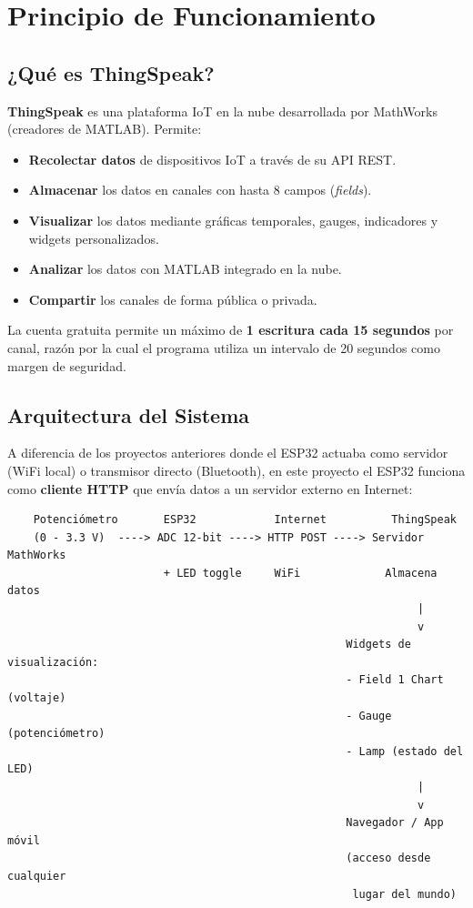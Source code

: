 \documentclass[12pt,a4paper]{article}
\begin{document}
\section{Principio de Funcionamiento}

\subsection{¿Qué es ThingSpeak?}

\textbf{ThingSpeak} es una plataforma IoT en la nube desarrollada por MathWorks (creadores de MATLAB). Permite:
\begin{itemize}
    \item \textbf{Recolectar datos} de dispositivos IoT a través de su API REST.
    \item \textbf{Almacenar} los datos en canales con hasta 8 campos (\textit{fields}).
    \item \textbf{Visualizar} los datos mediante gráficas temporales, gauges, indicadores y widgets personalizados.
    \item \textbf{Analizar} los datos con MATLAB integrado en la nube.
    \item \textbf{Compartir} los canales de forma pública o privada.
\end{itemize}

La cuenta gratuita permite un máximo de \textbf{1 escritura cada 15 segundos} por canal, razón por la cual el programa utiliza un intervalo de 20 segundos como margen de seguridad.

\subsection{Arquitectura del Sistema}

A diferencia de los proyectos anteriores donde el ESP32 actuaba como servidor (WiFi local) o transmisor directo (Bluetooth), en este proyecto el ESP32 funciona como \textbf{cliente HTTP} que envía datos a un servidor externo en Internet:

\begin{verbatim}
    Potenciómetro       ESP32            Internet          ThingSpeak
    (0 - 3.3 V)  ----> ADC 12-bit ----> HTTP POST ----> Servidor MathWorks
                        + LED toggle     WiFi             Almacena datos
                                                               |
                                                               v
                                                    Widgets de visualización:
                                                    - Field 1 Chart (voltaje)
                                                    - Gauge (potenciómetro)
                                                    - Lamp (estado del LED)
                                                               |
                                                               v
                                                    Navegador / App móvil
                                                    (acceso desde cualquier
                                                     lugar del mundo)
\end{verbatim}
\end{document}
